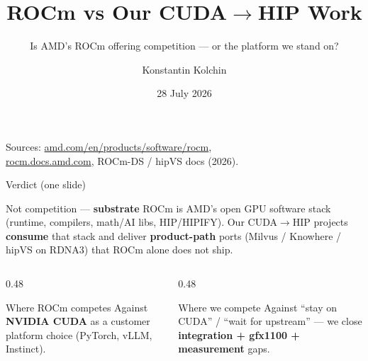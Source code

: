 \documentclass[aspectratio=169,11pt]{beamer}
\title{ROCm vs Our CUDA$\rightarrow$HIP Work}
\subtitle{Is AMD's ROCm offering competition --- or the platform we stand on?}
\author{Konstantin Kolchin}
\date{28 July 2026}
\begin{document}
\begin{frame}
  \titlepage
  \vspace{0.4em}
  \begin{center}
    \small
    Sources: \url{amd.com/en/products/software/rocm},\\
    \url{rocm.docs.amd.com}, ROCm-DS / hipVS docs (2026).
  \end{center}
\end{frame}

\begin{frame}{Verdict (one slide)}
  \begin{block}{Not competition --- \textbf{substrate}}
    ROCm is AMD's open GPU software stack (runtime, compilers, math/AI libs,
    HIP/HIPIFY). Our CUDA$\rightarrow$HIP projects \textbf{consume} that stack
    and deliver \textbf{product-path} ports (Milvus / Knowhere / hipVS on
    RDNA3) that ROCm alone does not ship.
  \end{block}

  \vspace{0.5em}
  \begin{columns}[T]
    \begin{column}{0.48\textwidth}
      \begin{block}{Where ROCm competes}
        \footnotesize
        Against \textbf{NVIDIA CUDA} as a
        customer platform choice
        (PyTorch, vLLM, Instinct).
      \end{block}
    \end{column}
    \begin{column}{0.48\textwidth}
      \begin{block}{Where we compete}
        \footnotesize
        Against ``stay on CUDA'' /
        ``wait for upstream'' ---
        we close \textbf{integration +
        gfx1100 + measurement} gaps.
      \end{block}
    \end{column}
  \end{columns}
\end{frame}
\end{document}
